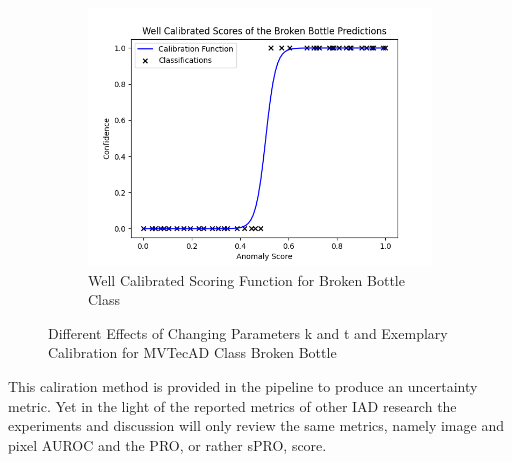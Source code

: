 \begin{figure}[htbp]
\begin{subfigure}[b]{0.3\textwidth}
        \includegraphics[width=\textwidth]{figures/anomaly_calibration_soft.png}
        \caption{Well Calibrated Scoring Function for Broken Bottle Class}
        \label{fig:sub3}
    \end{subfigure}
    \caption{Different Effects of Changing Parameters k and t and Exemplary Calibration for MVTecAD Class Broken Bottle}
    \label{fig:main}
\end{figure}

This caliration method is provided in the pipeline to produce an uncertainty metric. Yet in the light of the reported metrics of other IAD research the experiments and discussion will only 
review the same metrics, namely image and pixel AUROC and the PRO, or rather sPRO, score.








